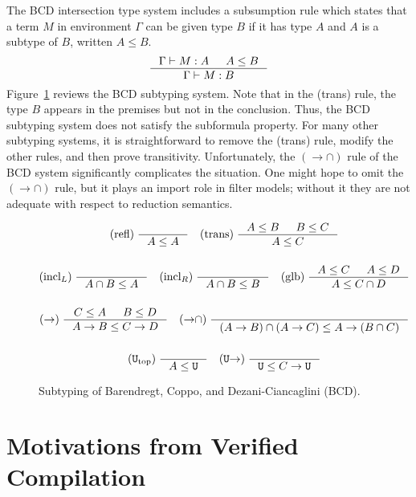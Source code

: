 \documentclass{article}
\begin{document}
The BCD intersection type system includes a subsumption rule which
states that a term $M$ in environment $\Gamma$ can be given type $B$
if it has type $A$ and $A$ is a subtype of $B$, written $A \leq B$.
\[
\inference{\Gamma \vdash M : A & A \leq B}
          {\Gamma \vdash M : B}
\]
Figure~\ref{fig:BCD-subtyping} reviews the BCD subtyping system.  Note
that in the (trans) rule, the type $B$ appears in the premises but not
in the conclusion. Thus, the BCD subtyping system does not satisfy the
subformula property.  For many other subtyping systems, it is
straightforward to remove the (trans) rule, modify the other rules,
and then prove transitivity.  Unfortunately, the $({\to}{\cap})$ rule
of the BCD system significantly complicates the situation.  One might
hope to omit the $({\to}{\cap})$ rule, but it plays an import role in
filter models; without it they are not adequate with respect to
reduction semantics.


\begin{figure}[tbp]
  \begin{gather*}
    \text{(refl)} \; \inference{}{A \leq A} \quad
    \text{(trans)} \; \inference{A \leq B & B \leq C}{A \leq C} \\[3ex]
    \text{(incl$_L$)} \; \inference{}{A \cap B \leq A} \quad
    \text{(incl$_R$)} \; \inference{}{A \cap B \leq B} \quad
    \text{(glb)} \; \inference{A \leq C & A \leq D}{A \leq C \cap D} \\[3ex]
    (\to) \; \inference{C \leq A & B \leq D}{A \to B \leq C \to D} \quad
    ({\to}{\cap}) \; \inference{}{(A \to B) \cap (A \to C) \leq A \to (B \cap C)} \\[3ex]
    (\TOP_{\mathrm{top}}) \; \inference{}{A \leq \TOP} \quad
    (\TOP{\to}) \; \inference{}{\TOP \leq C \to \TOP}
  \end{gather*}
  \caption{Subtyping of Barendregt, Coppo, and
    Dezani-Ciancaglini (BCD).}
  \label{fig:BCD-subtyping}
\end{figure}

\section{Motivations from Verified Compilation}
\label{sec:motivation}
\end{document}
